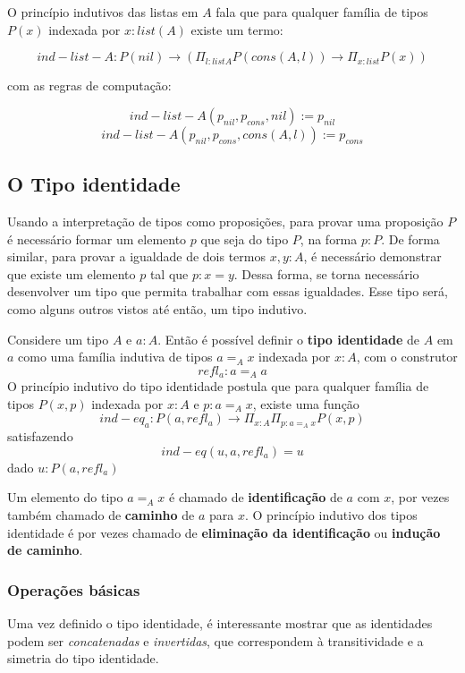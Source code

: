 \documentclass[../main.tex]{subfiles}
\begin{document}
O princípio indutivos das listas em $A$ fala que para qualquer família de tipos $P(x)$ indexada por $x : list(A)$ existe um termo:

$$ind-list-A : P(nil) \to (\Pi_{l : list A} P(cons (A, l)) \to \Pi_{x : list}P(x))$$

com as regras de computação:

$$ind-list-A (p_{nil}, p_{cons}, nil) := p_{nil}$$
$$ind-list-A (p_{nil}, p_{cons}, cons (A, l)) := p_{cons}$$

\subsection{O Tipo identidade}

Usando a interpretação de tipos como proposições, para provar uma proposição $P$ é necessário formar um elemento $p$ que seja do tipo $P$, na forma $p : P$. De forma similar, para provar a igualdade de dois termos $x, y : A$, é necessário demonstrar que existe um elemento $p$ tal que $p : x = y$. Dessa forma, se torna necessário desenvolver um tipo que permita trabalhar com essas igualdades. Esse tipo será, como alguns outros vistos até então, um tipo indutivo.

\begin{definition}
    Considere um tipo $A$ e $a : A$. Então é possível definir o \textbf{tipo identidade} de $A$ em $a$ como uma família indutiva de tipos $a =_A x$ indexada por $x : A$, com o construtor
    $$refl_a : a =_A a$$
    O princípio indutivo do tipo identidade postula que para qualquer família de tipos $P(x, p)$ indexada por $x : A$ e $p : a =_A x$, existe uma função
    $$ind-eq_a : P(a, refl_a) \to \Pi_{x : A}\Pi_{p: a=_A x} P(x, p)$$
    satisfazendo $$ind-eq(u, a, refl_a) = u$$ dado $u : P(a, refl_a)$
\end{definition}

Um elemento do tipo $a =_A x$ é chamado de \textbf{identificação} de $a$ com $x$, por vezes também chamado de \textbf{caminho} de $a$ para $x$. O princípio indutivo dos tipos identidade é por vezes chamado de \textbf{eliminação da identificação} ou \textbf{indução de caminho}.


\subsubsection{Operações básicas}

Uma vez definido o tipo identidade, é interessante mostrar que as identidades podem ser \emph{concatenadas} e \emph{invertidas}, que correspondem à transitividade e a simetria do tipo identidade.
\end{document}
